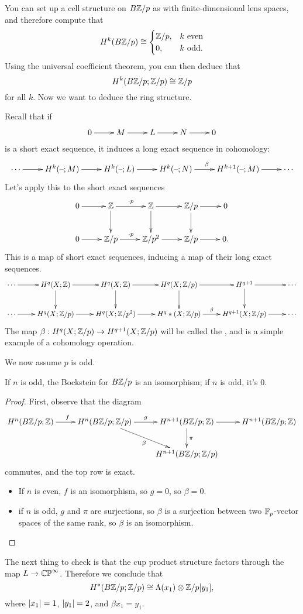 You can set up a cell structure on $B\mathbb Z/p$ as with finite-dimensional lens spaces, and therefore compute that
\[H^k(B\mathbb Z/p) \cong\begin{cases}
	\mathbb Z/p, &k\text{ even}\\
	0, &k\text{ odd.}
\end{cases}\]
Using the universal coefficient theorem, you can then deduce that
\[H^k(B\mathbb Z/p;\mathbb Z/p) \cong \mathbb Z/p\]
for all $k$. Now we want to deduce the ring structure.

Recall that if
\[\shortexact{M}{L}{N}{}\]
is a short exact sequence, it induces a long exact sequence in cohomology:
\[\xymatrix{
	\dotsb\ar[r] & H^k(\bl;M)\ar[r] &H^k(\bl;L)\ar[r] &H^k(\bl;N)\ar[r]^\beta &H^{k+1}(\bl;M)\ar[r] & \dotsb
}\]
Let's apply this to the short exact sequences
\[\xymatrix{
	0\ar[r] & \Z\ar[r]^{\cdot p}\ar[d]&\Z\ar[r]\ar[d] & \Z/p\ar[r]\ar[d] &0\\
	0\ar[r] & \Z/p\ar[r]^{\cdot p} &\Z/p^2\ar[r] & \Z/p\ar[r] &0.
}\]
This is a map of short exact sequences, inducing a map of their long exact sequences.
\begin{equation}
\begin{gathered}
\xymatrix{
	\dotsb\ar[r] & H^q(X;\Z)\ar[r]\ar[d] & H^q(X;\Z)\ar[r]\ar[d] & H^q(X;\Z/p)\ar[r]\ar[d] & H^{q+1}\ar[r]\ar[d] &
	\dotsb\\
	\dotsb\ar[r] & H^q(X;\Z/p)\ar[r] & H^q(X;\Z/p^2)\ar[r] & H^q*(X;\Z/p)\ar[r]^\beta &H^{q+1}(X;\Z/p)\ar[r] &
	\dotsb
}
\end{gathered}
\end{equation}
The map $\beta:H^q(X;\mathbb Z/p)\to H^{q+1}(X;\mathbb Z/p)$ will be called the , and is a simple
example of a cohomology operation.

We now assume $p$ is odd.
\begin{lem}
If $n$ is odd, the Bockstein for $B\mathbb Z/p$ is an isomorphism; if $n$ is odd, it's $0$.
\end{lem}
\begin{proof}
First, observe that the diagram
\[\xymatrix{
	H^n(B\Z/p;\Z)\ar[r]^f & H^n(B\Z/p;\Z/p)\ar[r]^g\ar[dr]_\beta & H^{n+1}(B\Z/p;\Z)\ar[d]^\pi\ar[r] &
	H^{n+1}(B\Z/p;\Z)\\
	&& H^{n+1}(B\Z/p;\Z/p)
}\]
commutes, and the top row is exact.
\begin{itemize}
	\item If $n$ is even, $f$ is an isomorphism, so $g = 0$, so $\beta = 0$.
	\item if $n$ is odd, $g$ and $\pi$ are surjections, so $\beta$ is a surjection between two $\mathbb F_p$-vector spaces
	of the same rank, so $\beta$ is an isomorphism.\qedhere
\end{itemize}
\end{proof}
The next thing to check is that the cup product structure factors through the map $L\to\mathbb{CP}^\infty$. Therefore we
conclude that
\[H^*(B\mathbb Z/p;\mathbb Z/p)\cong \Lambda(x_1)\otimes \mathbb Z/p[y_1],\]
where $\lvert x_1\rvert = 1$, $\lvert y_1\rvert = 2$, and $\beta x_1 = y_1$.

